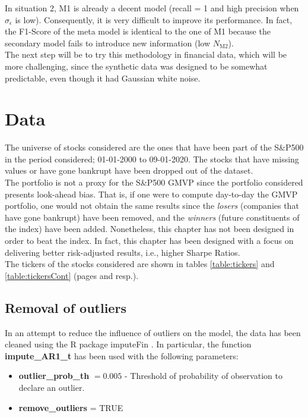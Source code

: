\documentclass[a4paper]{article}
\begin{document}
In situation 2, M1 is already a decent model (recall = 1 and high 
precision when $\sigma_\epsilon$ is low). Consequently, it is very 
difficult to improve its performance. In fact, the F1-Score of the 
meta model is identical to the one of M1 because the secondary model 
fails to introduce new information (low $N_{\text{M2}}$).\\

The next step will be to try this methodology in financial data, which 
will be more challenging, since the synthetic data was designed to be 
somewhat predictable, even though it had Gaussian white noise.

\section{Data}
The universe of stocks considered are the ones that have been part of 
the S\&P500 in the period considered; 01-01-2000 to 09-01-2020. The 
stocks that have missing values or have gone bankrupt have been 
dropped out of the dataset. \\

The portfolio is not a proxy for the S\&P500 GMVP since the portfolio 
considered presents look-ahead bias. That is, if one were to compute 
day-to-day the GMVP portfolio, one would not obtain the same results 
since the \textit{losers} (companies that have gone bankrupt) have 
been removed, and the \textit{winners} (future constituents of the 
index) have been added. Nonetheless, this chapter has not been 
designed in order to beat the index. In fact, this chapter has been 
designed with a focus on delivering better risk-adjusted results, 
i.e., higher Sharpe Ratios. \\

The tickers of the stocks considered are shown in tables 
\ref{table:tickers} and \ref{table:tickersCont} (pages
\pageref{table:tickers} and \pageref{table:tickersCont} resp.).

\subsection{Removal of outliers}
\label{sec:removalOutliers}
In an attempt to reduce the influence of outliers on the model, the 
data has been cleaned using the R package imputeFin \cite{imputeFin}.
 In particular, the function \textbf{impute\_AR1\_t} has been used 
 with the following parameters:

\begin{itemize}
	\item \textbf{outlier\_prob\_th} $= 0.005$ - Threshold of 
	probability of observation to declare an outlier.
	\item \textbf{remove\_outliers} = TRUE
\end{itemize}
\end{document}
